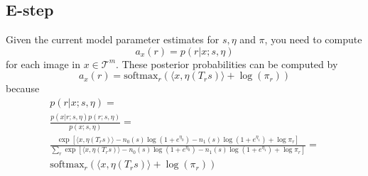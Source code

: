\documentclass[10pt]{article}
\begin{document}
\subsection{E-step}
Given the current model parameter estimates for $s, \eta$ and $\pi$, you need to compute
\begin{equation}
    a_x(r) = p(r | x; s, \eta)
\end{equation}
for each image in $x \in \mathcal{T}^m$.
These posterior probabilities can be computed by
\begin{equation}
    a_x(r) = \text{softmax}_{r}(\langle x, \eta(T_rs) \rangle + \log(\pi_r))
\end{equation}
because
\begin{equation}
    \begin{aligned}
        p(r | x; s, \eta) = \\
        \frac{p(x | r; s, \eta) p(r; s, \eta)}{p(x; s, \eta)} = \\
        \frac{\exp{[\langle x, \eta(T_rs) \rangle - n_0(s)\log(1 + e^{\eta_0}) - n_1(s)\log(1 + e^{\eta_1}) + \log{\pi_r}]}}{\sum_r{\exp{[\langle x, \eta(T_rs) \rangle - n_0(s)\log(1 + e^{\eta_0}) - n_1(s)\log(1 + e^{\eta_1}) + \log{\pi_r}]}}} = \\
        \text{softmax}_{r}(\langle x, \eta(T_rs) \rangle + \log(\pi_r))
    \end{aligned}
\end{equation}
\end{document}
